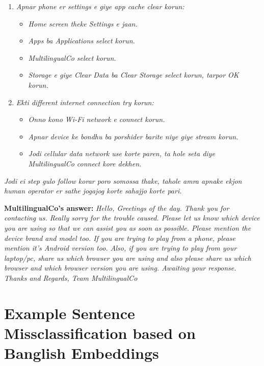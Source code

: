 \documentclass[sigconf]{acmart}
\begin{document}
\begin{enumerate}
    \item \textit{Apnar phone er settings e giye app cache clear korun:}
    \begin{itemize}
        \item \textit{Home screen theke Settings e jaan.}
        \item \textit{Apps ba Applications select korun.}
        \item \textit{MultilingualCo select korun.}
        \item \textit{Storage e giye Clear Data ba Clear Storage select korun, tarpor OK korun.}
    \end{itemize}
    \item \textit{Ekti different internet connection try korun:}
    \begin{itemize}
        \item \textit{Onno kono Wi-Fi network e connect korun.}
        \item \textit{Apnar device ke bondhu ba porshider barite niye giye stream korun.}
        \item \textit{Jodi cellular data network use korte paren, ta hole seta diye MultilingualCo connect kore dekhen.}
    \end{itemize}
\end{enumerate}

\noindent\textit{Jodi ei step gulo follow korar poro somossa thake, tahole amra apnake ekjon human operator er sathe jogajog korte sahajjo korte pari.}\newline

\noindent\textbf{MultilingualCo's answer:} \textit{Hello, Greetings of the day. Thank you for contacting us. Really sorry for the trouble caused. Please let us know which device you are using so that we can assist you as soon as possible. Please mention the device brand and model too. If you are trying to play from a phone, please mention it's Android version too. Also, if you are trying to play from your laptop/pc, share us which browser you are using and also please share us which browser and which browser version you are using. Awaiting your response. Thanks and Regards, Team MultilingualCo}

\section{Example Sentence Missclassification based on Banglish Embeddings}
\label{appendix:b}
\end{document}
